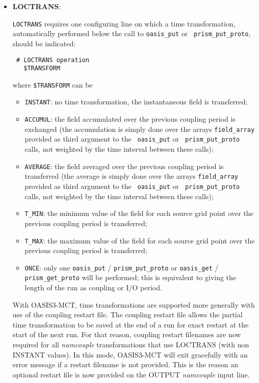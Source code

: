 \begin{itemize}

\item {\bf LOCTRANS}:

{\tt LOCTRANS} requires one configuring line on which a time
transformation, automatically performed below the call to
{\tt oasis\_put} or {\tt
  prism\_put\_proto}, should be indicated:

  \begin{verbatim}
 # LOCTRANS operation
   $TRANSFORM
  \end{verbatim}
\vspace{-0.5cm} 
where {\tt \$TRANSFORM} can be

  \begin{itemize}
    \item {\tt INSTANT}: no time transformation, the instantaneous field is
    transferred; 
    \item {\tt ACCUMUL}: the field accumulated over the previous coupling
    period is exchanged (the accumulation is simply done over the arrays
    {\tt field\_array}  provided as third argument to the {\tt
      oasis\_put} or {\tt
    prism\_put\_proto} calls, not weighted by the time interval
    between these calls);
    \item {\tt AVERAGE}: the field averaged over the previous coupling
    period is transferred (the average is simply done over the arrays
    {\tt field\_array} provided as third argument to the {\tt
      oasis\_put} or {\tt
    prism\_put\_proto} calls, not weighted by the time interval
    between these calls);
    \item {\tt T\_MIN}: the minimum value of the field
    for each source grid point over the previous coupling period is
    transferred; 
    \item {\tt T\_MAX}: the maximum value of the field for each source grid
    point over the previous coupling period is transferred;
    \item {\tt ONCE}: only one {\tt oasis\_put} / {\tt prism\_put\_proto} or
      {\tt oasis\_get} / {\tt
prism\_get\_proto} will be performed; this is equivalent to giving the
length of the run as coupling or I/O period. 
  \end{itemize}

With OASIS3-MCT, time transformations are supported more generally
with use of the coupling restart file.  The coupling restart file allows the partial
time transformation to be saved at the end of a run for exact
restart at the start of the next run.  For that reason, coupling restart
filenames are now required for all {\it namcouple} transformations that use
LOCTRANS (with non INSTANT values).  In this mode, OASIS3-MCT will exit
gracefully with an error message if a restart filename is not provided.
This is the reason an optional restart file is now provided on the
OUTPUT {\it namcouple} input line.
\end{itemize}

